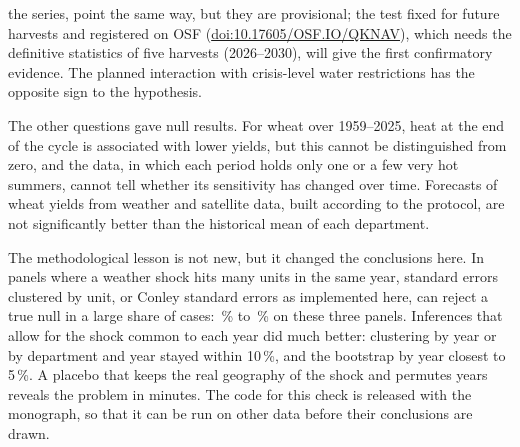 the series, point the same way, but they are provisional; the test fixed for future harvests and registered on OSF (\href{https://doi.org/10.17605/OSF.IO/QKNAV}{doi:10.17605/OSF.IO/QKNAV}), which needs the definitive statistics of five harvests (2026--2030), will give the first confirmatory evidence. The planned interaction with crisis-level water restrictions has the opposite sign to the hypothesis.

The other questions gave null results. For wheat over 1959--2025, heat at the end of the cycle is associated with lower yields, but this cannot be distinguished from zero, and the data, in which each period holds only one or a few very hot summers, cannot tell whether its sensitivity has changed over time. Forecasts of wheat yields from weather and satellite data, built according to the protocol, are not significantly better than the historical mean of each department.

The methodological lesson is not new, but it changed the conclusions here. In panels where a weather shock hits many units in the same year, standard errors clustered by unit, or Conley standard errors as implemented here, can reject a true null in a large share of cases: \UsualSizeMin\,\% to \UsualSizeMax\,\% on these three panels. Inferences that allow for the shock common to each year did much better: clustering by year or by department and year stayed within 10\,\%, and the bootstrap by year closest to 5\,\%. A placebo that keeps the real geography of the shock and permutes years reveals the problem in minutes. The code for this check is released with the monograph, so that it can be run on other data before their conclusions are drawn.
